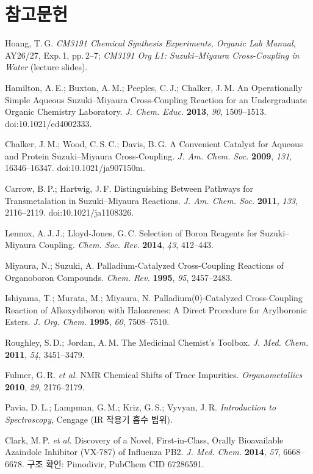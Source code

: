 \documentclass[10pt,a4paper]{article}
\begin{document}
\section*{참고문헌}
{\footnotesize
\begin{enumerate}[leftmargin=6mm,itemsep=0.3mm,label={[\arabic*]}]
\item Hoang, T.\,G. \emph{CM3191 Chemical Synthesis Experiments, Organic Lab Manual}, AY26/27, Exp.\,1, pp.\,2--7; \emph{CM3191 Org L1: Suzuki--Miyaura Cross-Coupling in Water} (lecture slides).
\item Hamilton, A.\,E.; Buxton, A.\,M.; Peeples, C.\,J.; Chalker, J.\,M. An Operationally Simple Aqueous Suzuki--Miyaura Cross-Coupling Reaction for an Undergraduate Organic Chemistry Laboratory. \emph{J. Chem. Educ.} \textbf{2013}, \emph{90}, 1509--1513. doi:10.1021/ed4002333.
\item Chalker, J.\,M.; Wood, C.\,S.\,C.; Davis, B.\,G. A Convenient Catalyst for Aqueous and Protein Suzuki--Miyaura Cross-Coupling. \emph{J. Am. Chem. Soc.} \textbf{2009}, \emph{131}, 16346--16347. doi:10.1021/ja907150m.
\item Carrow, B.\,P.; Hartwig, J.\,F. Distinguishing Between Pathways for Transmetalation in Suzuki--Miyaura Reactions. \emph{J. Am. Chem. Soc.} \textbf{2011}, \emph{133}, 2116--2119. doi:10.1021/ja1108326.
\item Lennox, A.\,J.\,J.; Lloyd-Jones, G.\,C. Selection of Boron Reagents for Suzuki--Miyaura Coupling. \emph{Chem. Soc. Rev.} \textbf{2014}, \emph{43}, 412--443.
\item Miyaura, N.; Suzuki, A. Palladium-Catalyzed Cross-Coupling Reactions of Organoboron Compounds. \emph{Chem. Rev.} \textbf{1995}, \emph{95}, 2457--2483.
\item Ishiyama, T.; Murata, M.; Miyaura, N. Palladium(0)-Catalyzed Cross-Coupling Reaction of Alkoxydiboron with Haloarenes: A Direct Procedure for Arylboronic Esters. \emph{J. Org. Chem.} \textbf{1995}, \emph{60}, 7508--7510.
\item Roughley, S.\,D.; Jordan, A.\,M. The Medicinal Chemist's Toolbox. \emph{J. Med. Chem.} \textbf{2011}, \emph{54}, 3451--3479.
\item Fulmer, G.\,R. \emph{et al.} NMR Chemical Shifts of Trace Impurities. \emph{Organometallics} \textbf{2010}, \emph{29}, 2176--2179.
\item Pavia, D.\,L.; Lampman, G.\,M.; Kriz, G.\,S.; Vyvyan, J.\,R. \emph{Introduction to Spectroscopy}, Cengage (IR 작용기 흡수 범위).
\item Clark, M.\,P. \emph{et al.} Discovery of a Novel, First-in-Class, Orally Bioavailable Azaindole Inhibitor (VX-787) of Influenza PB2. \emph{J. Med. Chem.} \textbf{2014}, \emph{57}, 6668--6678. \quad 구조 확인: Pimodivir, PubChem CID 67286591.
\end{enumerate}
}
\end{document}
